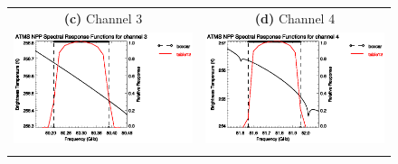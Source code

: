 \begin{figure}[H]
\begin{tabular}{c c}
    \textsf{\textbf{(c)} Channel 3} &
    \textsf{\textbf{(d)} Channel 4} \\
    \includegraphics[bb=70 400 300 559,clip,scale=1.0]{graphics/srf/table12/atms_npp.ch3.osrf.eps} &
    \includegraphics[bb=70 400 300 559,clip,scale=1.0]{graphics/srf/table12/atms_npp.ch4.osrf.eps} \\\\


\end{tabular}
\end{figure}
